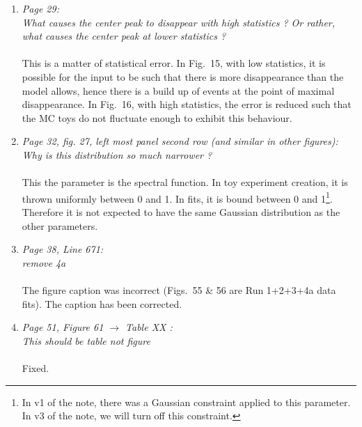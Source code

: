 \begin{enumerate}
  In v3 of the note, we will fit for $\delta_{CP}$.

  \vspace{5 mm}
\item
  {\em
    Page 29:\\
    What causes the center peak to disappear with high statistics ?
    Or rather, what causes the center peak at lower statistics ?
  }\\
  \\
  This is a matter of statistical error.
  In Fig.\ 15, with low statistics, it is possible for the input to be such
  that there is more disappearance than the model allows, hence there
  is a build up of events at the point of maximal disappearance.
  In Fig.\ 16, with high statistics, the error is reduced such that
  the MC toys do not fluctuate enough to exhibit this behaviour.
  
  \vspace{5 mm}
\item
  {\em
    Page 32, fig. 27, left most panel second row (and similar in other figures):\\
    Why is this distribution so much narrower ?
  }\\
  \\
  This the parameter is the spectral function.
  In toy experiment creation, it is thrown uniformly between 0 and 1.
  In fits, it is bound between 0 and 1\footnote{
    In v1 of the note, there was a Gaussian constraint applied to this parameter.
    In v3 of the note, we will turn off this constraint.
  }.
  Therefore it is not expected to have the same Gaussian distribution as the other parameters.
  
  \vspace{5 mm}
\item
  {\em
    Page 38, Line 671:\\
    remove 4a
  }\\
  \\
  The figure caption was incorrect (Figs.\ 55 \& 56 are Run 1+2+3+4a data fits).
  The caption has been corrected.
  
  \vspace{5 mm}
\item
  {\em
    Page 51, Figure 61 $\rightarrow$ Table XX :\\
    This should be table not figure
  }\\
  \\
  Fixed.
  

\end{enumerate}
